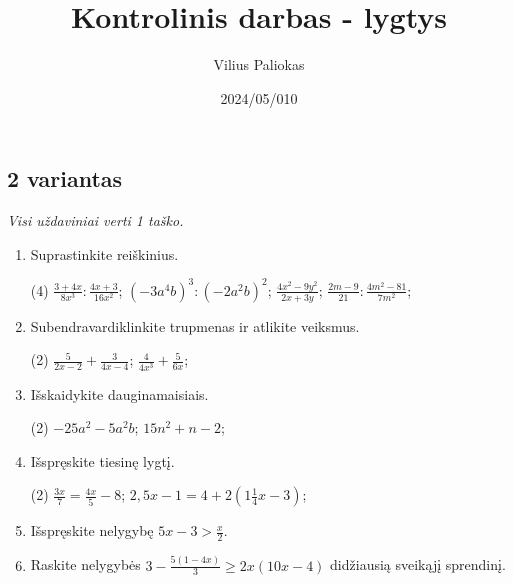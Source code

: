 \documentclass[a4paper]{article}
\title{Kontrolinis darbas - lygtys}
\author{Vilius Paliokas}
\date{2024/05/010}
\begin{document}
\thispagestyle{fancy}

\titlespacing*{\subsection}{0pt}{.75ex}{0.75ex}

\subsection*{2 variantas}

\textit{Visi uždaviniai verti 1 taško.}

\begin{enumerate}
      \item Suprastinkite reiškinius.
            \begin{tasks}[item-format={\normalfont}, after-item-skip=2mm](4)
                  \task $\frac{3+4x}{8x^3}:\frac{4x+3}{16x^2}$;
                  \task $(-3a^4b)^3:(-2a^2b)^2$;
                  \task $\frac{4x^2-9y^2}{2x+3y}$;
                  \task $\frac{2m-9}{21}:\frac{4m^2-81}{7m^2}$;
            \end{tasks}

      \item Subendravardiklinkite trupmenas ir atlikite veiksmus.
            \begin{tasks}[item-format={\normalfont}, after-item-skip=2mm](2)
                  \task $\frac{5}{2x-2}+\frac{3}{4x-4}$;
                  \task $\frac{4}{4x^3}+\frac{5}{6x}$;
            \end{tasks}

      \item Išskaidykite dauginamaisiais.
            \begin{tasks}[item-format={\normalfont}, after-item-skip=2mm](2)
                  \task $-25a^2-5a^2b$;
                  \task $15n^2+n-2$;
            \end{tasks}

      \item Išspręskite tiesinę lygtį.
            \begin{tasks}[item-format={\normalfont}, after-item-skip=2mm](2)
                  \task $\frac{3x}{7}=\frac{4x}{5}-8$;
                  \task $2,5x-1=4+2(1\frac{1}{4}x-3)$;
            \end{tasks}

      \item Išspręskite nelygybę $5x-3>\frac{x}{2}$.
      \item Raskite nelygybės $3-\frac{5(1-4x)}{3}\geq2x(10x-4)$ didžiausią sveikąjį sprendinį.
\end{enumerate}
\end{document}
